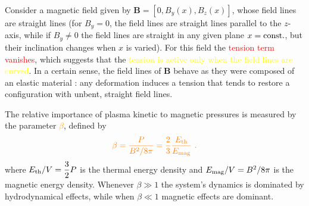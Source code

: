 \documentclass[12pt,a4paper]{article}
\renewcommand{\vec}[1]{\boldsymbol{#1}}
\begin{document}
Consider a magnetic field given by $\vec{B} = [0, B_y(x), B_z(x)]$, whose field lines are straight lines (for $B_y = 0$, the field lines are straight lines parallel to the $z$-axis, while if $B_y \neq 0$ the field lines are straight in any given plane $x = \rm const.$, but their inclination changes when $x$ is varied). For this field the \textcolor{red}{tension term vanishes}, which suggests that the \textcolor{yellow}{tension is active only when the field lines are curved}. In a certain sense, the field lines of $\vec{B}$ behave as they were composed of an elastic material : any deformation induces a tension that tends to restore a configuration with unbent, straight field lines.

The relative importance of plasma kinetic to magnetic pressures is measured by the parameter \textcolor{orange}{$\beta$}, defined by
\begin{equation}
\color{orange} \beta = \frac{P}{B^2/8\pi} = \frac{2}{3} \frac{E_{\rm th} }{E_{\rm mag}}~.
\end{equation}
where $E_{\rm th}/V = \dfrac{3}{2} P$ is the thermal energy density and $E_{\rm mag}/V = B^2/8\pi$ is the magnetic energy density. Whenever $\beta \gg 1$ the system's dynamics is dominated by hydrodynamical effects, while when $\beta \ll 1$ magnetic effects are dominant. 
\end{document}
